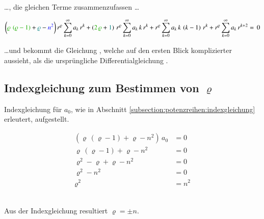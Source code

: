 \\
\begin{normalsize}
	\dots , die gleichen Terme zusammenzufassen \dots
\end{normalsize}
\begin{align}
	\biggl(
	\textcolor{mygreen}{\varrho \, \left( \varrho - 1 \right)}
	+ 
	\textcolor{teal}{\varrho}
	-
	\textcolor{blue}{n^2}
	\biggr)
	\, r^{\varrho}
	\sum_{k=0}^{\infty} a_k \, r^k
	+ 
	\left(	
	\textcolor{mygreen}{2 \, \varrho}
	+
	\textcolor{teal}{1}
	\right)
	\, r^{\varrho}
	\sum_{k=0}^{\infty} a_k \, k \, r^k
	+
	r^{\varrho}
	\sum_{k=0}^{\infty} a_k \, k \, \left( k - 1 \right) \, r^k
	+ 
	r^{\varrho}
	\sum_{k=0}^{\infty} a_k \, r^{k + 2}
	= \, 0
	\label{eq:bessel:potenzreihe:dgl:vereinfacht}
\end{align}
\begin{normalsize}
	\dots und bekommt die Gleichung ,
	welche auf den ersten Blick komplizierter aussieht,
	als die urspr\"ungliche Differentialgleichung .
\end{normalsize}
\subsection[Indexgleichung f\"ur $\varrho$]{Indexgleichung zum Bestimmen von $\varrho$}
\begin{normalsize}
	Indexgleichung f\"ur $a_0$,
	wie in Abschnitt \ref{subsection:potenzreihen:indexgleichung} erleutert,
	aufgestellt.
\end{normalsize}
\begin{align*}	\left( \varrho \, \left( \varrho -1 \right) + \varrho - n^2 \right) \, a_0 &= 0 \\
	\varrho \, \left( \varrho -1 \right) + \varrho - n^2 &= 0 \\
	\varrho ^2 - \varrho + \varrho -n^2 &= 0  \\
	\varrho ^2 - n^2 &= 0 \\
	\varrho ^2 &= n^2
\end{align*}
\\
\begin{normalsize}
	Aus der Indexgleichung resultiert $\varrho = \pm n$.
	
\end{normalsize}


